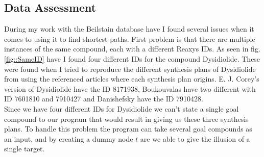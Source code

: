\documentclass[a4paper,10pt,titlepage]{paper}
\begin{document}
\subsection{Data Assessment}
During my work with the Beilstain database have I found several issues when it comes to using it to find shortest paths.
First problem is that there are multiple instances of the same compound, each with a different Reaxys IDs. As seen in fig.\ref{fig::SameID} have I found four different IDs for the compound Dysidiolide. These were found when I tried to reproduce the different synthesis plans of Dysidiolide from \cite{SynthesisPlans} using the referenced articles where each synthesis plan origins. E. J. Corey's version of Dysidiolide have the ID 8171938, Boukouvalas have two different with ID 7601810 and 7910427 and Danishefsky have the ID 7910428. \\
Since we have four different IDs for Dysidiolide we can't state a single goal compound to our program that would result in giving us these three synthesis plans. To handle this problem the program can take several goal compounds as an input, and by creating a dummy node $t$ are we able to give the illusion of a single target.
\end{document}
